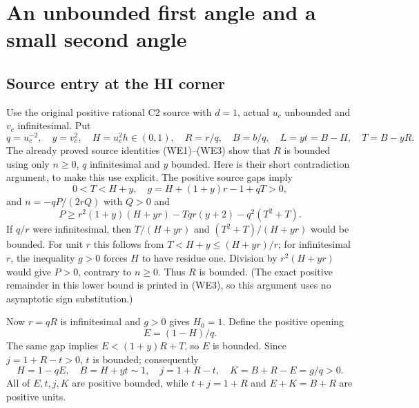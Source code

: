 \section{An unbounded first angle and a small second angle}
\subsection{Source entry at the HI corner}
\label{component:p54b8f20ad2dd}

Use the original positive rational C2 source with $d=1$, actual
$u_c$ unbounded and $v_c$ infinitesimal. Put
\[
 q=u_c^{-2},\quad y=v_c^2,\quad H=u_c^2h\in(0,1),
 \quad R=r/q,\quad B=b/q,\quad L=yt=B-H,\quad T=B-yR.
\]
The already proved source identities (WE1)--(WE3) show that $R$ is
bounded using only $n\geq0$, $q$ infinitesimal and $y$ bounded.
Here is their short contradiction argument, to make this use
explicit. The positive source gaps imply
\[
 0<T<H+y,\quad g=H+(1+y)r-1+qT>0,
\]
and $n=-qP/(2rQ)$ with $Q>0$ and
\[
 P\ge r^2(1+y)(H+yr)-Tqr(y+2)-q^2(T^2+T).
\]
If $q/r$ were infinitesimal, then $T/(H+yr)$ and
$(T^2+T)/(H+yr)$ would be bounded. For unit $r$ this follows
from $T<H+y\le(H+yr)/r$; for infinitesimal $r$, the inequality
$g>0$ forces $H$ to have residue one. Division by $r^2(H+yr)$
would give $P>0$, contrary to $n\geq0$. Thus $R$ is bounded.
(The exact positive remainder in this lower bound is printed in
(WE3), so this argument uses no asymptotic sign substitution.)

Now $r=qR$ is infinitesimal and $g>0$ gives $H_0=1$.
Define the positive opening
\[
 E=(1-H)/q.
\]
The same gap implies
$E<(1+y)R+T$, so $E$ is bounded. Since $j=1+R-t>0$,
$t$ is bounded; consequently
\[
 H=1-qE,\quad B=H+yt\sim1,\quad
 j=1+R-t,\quad K=B+R-E=g/q>0.
\]
All of $E,t,j,K$ are positive bounded, while
$t+j=1+R$ and $E+K=B+R$ are positive units.

